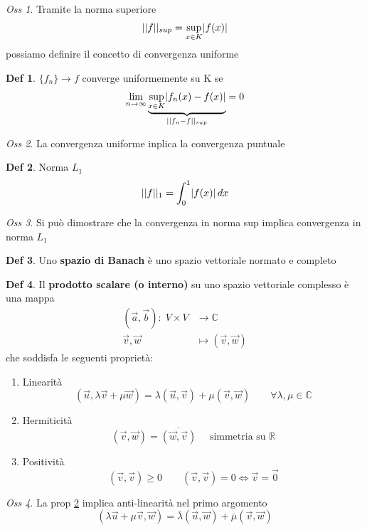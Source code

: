 \documentclass[a4paper,11pt]{report}
\theoremstyle{remark}
\newtheorem*{oss}{Oss}
\theoremstyle{definition}
\newtheorem*{Def}{Def}
\newcommand{\C}{\mathbb{C}}
\newcommand{\R}{\mathbb{R}}
\DeclarePairedDelimiter{\abs}{\lvert}{\rvert}
\begin{document}
\begin{oss}
	Tramite la norma superiore 
	\[||f||_{sup} = \sup_{x\in K} \abs{f(x)}\]
	possiamo definire il concetto di convergenza uniforme
\end{oss}

\begin{Def}
	$\{f_n\} \to f$ converge uniformemente su K se 
	\[\lim_{n\to\infty} \underbrace{\sup_{x\in K} \abs{f_n(x)-f(x)}}_{||f_n-f||_{sup}} =0\]
\end{Def}

\begin{oss}
	La convergenza uniforme inplica la convergenza puntuale
\end{oss}

\begin{Def}
	Norma $L_1$
	\[||f||_1 = \int_0^1 \abs{f(x)}\, dx\]
\end{Def}

\begin{oss}
	Si può dimostrare che la convergenza in norma sup implica convergenza in norma $L_1$
\end{oss}

\begin{Def}
	Uno \textbf{spazio di Banach} è uno spazio vettoriale normato e completo
\end{Def}

\begin{Def}
	Il \textbf{prodotto scalare (o interno)} su uno spazio vettoriale complesso è una mappa 
	\begin{align*}
		(\vec{a},\vec{b}): \; V\times V &\to \C \\
		\vec{v},\vec{w} &\mapsto (\vec{v},\vec{w})
	\end{align*}
	che soddisfa le seguenti proprietà:
	\begin{enumerate}
		\item Linearità
		\[(\vec{u}, \lambda\vec{v}+\mu\vec{w}) = \lambda(\vec{u}, \vec{v}) + \mu(\vec{v},\vec{w}) \qquad \forall\lambda,\mu \in \C\]
		\item Hermiticità \label{2}
		\[(\vec{v}, \vec{w}) = \overline{(\vec{w},\vec{v})} \quad \text{ simmetria su $\R$}\]
		\item Positività
		\[(\vec{v},\vec{v})\ge 0 \qquad (\vec{v},\vec{v})=0 \iff \vec{v} = \vec{0}\]
	\end{enumerate}
\end{Def}

\begin{oss}
	La prop \hyperref[2]{2} implica anti-linearità nel primo argomento
	\[(\lambda\vec{u}+\mu\vec{v}, \vec{w}) = \bar{\lambda}(\vec{u},\vec{w})+\bar{\mu}(\vec{v},\vec{w})\]
\end{oss}
\end{document}
